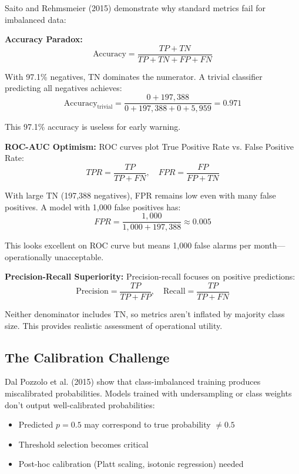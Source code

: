 \documentclass{article}
\begin{document}
Saito and Rehmsmeier (2015) demonstrate why standard metrics fail for imbalanced data:

\textbf{Accuracy Paradox:}
\begin{equation}
\text{Accuracy} = \frac{TP + TN}{TP + TN + FP + FN}
\end{equation}

With 97.1\% negatives, TN dominates the numerator. A trivial classifier predicting all negatives achieves:
\begin{equation}
\text{Accuracy}_{\text{trivial}} = \frac{0 + 197,388}{0 + 197,388 + 0 + 5,959} = 0.971
\end{equation}

This 97.1\% accuracy is useless for early warning.

\textbf{ROC-AUC Optimism:}
ROC curves plot True Positive Rate vs. False Positive Rate:
\begin{equation}
TPR = \frac{TP}{TP + FN}, \quad FPR = \frac{FP}{FP + TN}
\end{equation}

With large TN (197,388 negatives), FPR remains low even with many false positives. A model with 1,000 false positives has:
\begin{equation}
FPR = \frac{1,000}{1,000 + 197,388} \approx 0.005
\end{equation}

This looks excellent on ROC curve but means 1,000 false alarms per month---operationally unacceptable.

\textbf{Precision-Recall Superiority:}
Precision-recall focuses on positive predictions:
\begin{equation}
\text{Precision} = \frac{TP}{TP + FP}, \quad \text{Recall} = \frac{TP}{TP + FN}
\end{equation}

Neither denominator includes TN, so metrics aren't inflated by majority class size. This provides realistic assessment of operational utility.

\subsection{The Calibration Challenge}

Dal Pozzolo et al. (2015) show that class-imbalanced training produces miscalibrated probabilities. Models trained with undersampling or class weights don't output well-calibrated probabilities:

\begin{itemize}
    \item Predicted $p = 0.5$ may correspond to true probability $\neq 0.5$
    \item Threshold selection becomes critical
    \item Post-hoc calibration (Platt scaling, isotonic regression) needed
\end{itemize}
\end{document}
